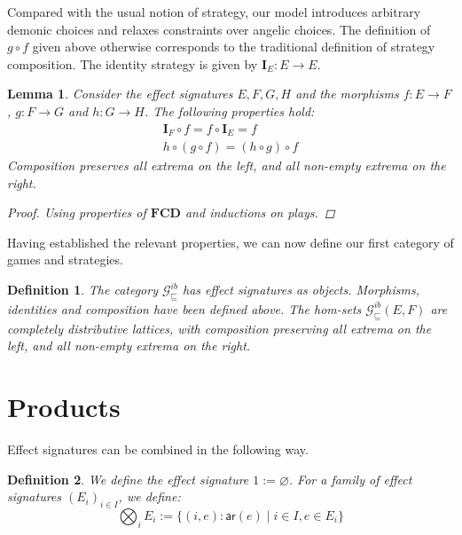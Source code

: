 \documentclass[draft,11pt]{report}
\newtheorem{definition}{Definition}
\newtheorem{lemma}{Lemma}
\newcommand{\gcat}{\mathcal{G}_{\sqsubseteq}}
\newcommand{\kw}[1]{\ensuremath{ \mathsf{#1} }}
\begin{document}
Compared with the usual notion of strategy,
our model introduces arbitrary demonic choices and
relaxes constraints over angelic choices.
The definition of $g \circ f$ given above
otherwise corresponds to the traditional
definition of strategy composition.
The identity strategy is given by $\mathbf{I}_E : E \rightarrow E$.

\begin{lemma}
Consider the effect signatures $E, F, G, H$ and
the morphisms
$f : E \rightarrow F$,
$g : F \rightarrow G$ and
$h : G \rightarrow H$.
The following properties hold:
\begin{gather*}
  \mathbf{I}_F \circ f = f \circ \mathbf{I}_E = f \\
  h \circ (g \circ f) = (h \circ g) \circ f
\end{gather*}
Composition preserves all extrema on the left,
and all non-empty extrema on the right.
\begin{proof}
Using properties of $\mathbf{FCD}$
and inductions on plays.
\end{proof}
\end{lemma}

Having established the relevant properties,
we can now define our first category of games and strategies.

\begin{definition}
The category $\gcat^{ib}$ has effect signatures as objects.
Morphisms, identities and composition have been defined above.
The hom-sets $\gcat^{ib}(E, F)$
are completely distributive lattices,
with composition preserving all extrema on the left,
and all non-empty extrema on the right.
\end{definition}


\section{Products} %

Effect signatures can be combined in the following way.

\begin{definition}
We define the effect signature
$1 := \varnothing$.
For a family of effect signatures $(E_i)_{i \in I}$,
we define:
\[
  \bigotimes_i E_i := \{ (i, e) : \kw{ar}(e) \mid i \in I, e \in E_i \}
\]
\end{definition}
\end{document}
